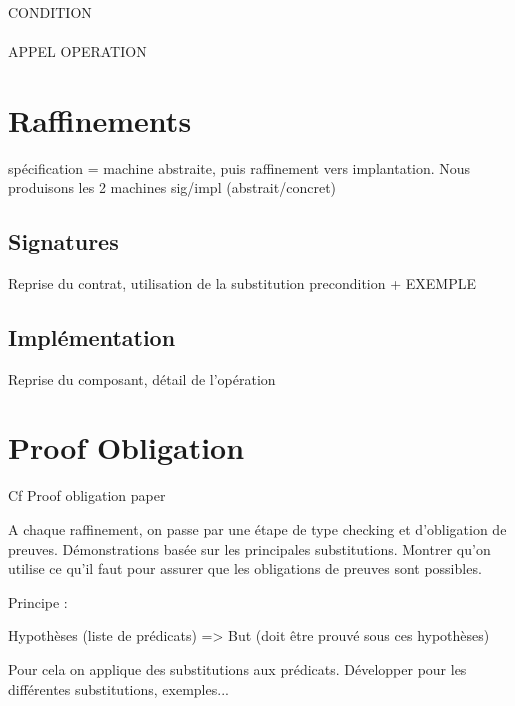 \paragraph{}
CONDITION

\paragraph{}
APPEL OPERATION





\section{Raffinements}
spécification = machine abstraite, puis raffinement vers
implantation.
Nous produisons les 2 machines sig/impl (abstrait/concret)

\subsection{Signatures}

Reprise du contrat, utilisation de la substitution precondition
+
EXEMPLE

\subsection{Implémentation}

Reprise du composant, détail de l'opération



\section{Proof Obligation}
Cf Proof obligation paper

A chaque raffinement, on passe par une étape de type checking et
d'obligation de preuves. Démonstrations basée sur les principales
substitutions. Montrer qu'on utilise ce qu'il faut pour assurer que
les obligations de preuves sont possibles.

Principe :

Hypothèses (liste de prédicats)
=>
But (doit être prouvé sous ces hypothèses)

Pour cela on applique des substitutions aux prédicats. Développer pour les
différentes substitutions, exemples...

